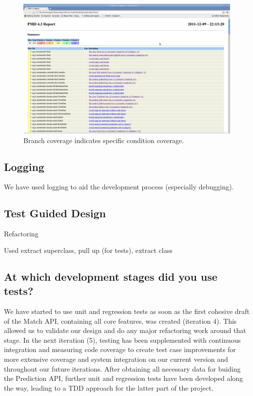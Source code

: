 \documentclass[10pt]{article}
\begin{document}
\begin{figure}[ht]
\centering
\includegraphics[bb=0 0 1680 1050, scale = 0.2]{pmd.png}
\caption{Branch coverage indicates specific condition coverage.}
\end{figure}

\subsection{Logging}

We have used logging to aid the development process (especially debugging).

\subsection{Test Guided Design}
Refactoring

Used extract superclass, pull up (for tests), extract class

\subsection{At which development stages did you use tests? }

We have started to use unit and regression tests as soon as the first cohesive draft of the Match API, containing all core features, was created (iteration 4). This allowed us to validate our design and do any major refactoring work around that stage. In the next iteration (5), testing has been supplemented with continuous integration and measuring code coverage to create test case improvements for more extensive coverage and system integration on our current version and throughout our future iterations. After obtaining all necessary data for buiding the Prediction API, further unit and regression tests have been developed along the way, leading to a TDD approach for the latter part of the project.
\end{document}
